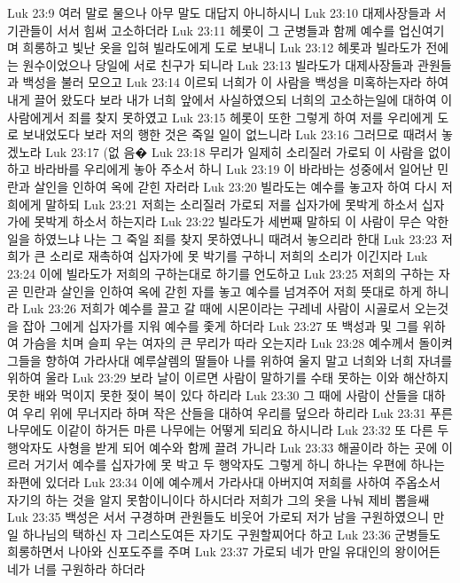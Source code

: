 Luk 23:9  여러 말로 물으나 아무 말도 대답지 아니하시니
Luk 23:10  대제사장들과 서기관들이 서서 힘써 고소하더라
Luk 23:11  헤롯이 그 군병들과 함께 예수를 업신여기며 희롱하고 빛난 옷을 입혀 빌라도에게 도로 보내니
Luk 23:12  헤롯과 빌라도가 전에는 원수이었으나 당일에 서로 친구가 되니라
Luk 23:13  빌라도가 대제사장들과 관원들과 백성을 불러 모으고
Luk 23:14  이르되 너희가 이 사람을 백성을 미혹하는자라 하여 내게 끌어 왔도다 보라 내가 너희 앞에서 사실하였으되 너희의 고소하는일에 대하여 이 사람에게서 죄를 찾지 못하였고
Luk 23:15  헤롯이 또한 그렇게 하여 저를 우리에게 도로 보내었도다 보라 저의 행한 것은 죽일 일이 없느니라
Luk 23:16  그러므로 때려서 놓겠노라
Luk 23:17  (없 음�
Luk 23:18  무리가 일제히 소리질러 가로되 이 사람을 없이하고 바라바를 우리에게 놓아 주소서 하니
Luk 23:19  이 바라바는 성중에서 일어난 민란과 살인을 인하여 옥에 갇힌 자러라
Luk 23:20  빌라도는 예수를 놓고자 하여 다시 저희에게 말하되
Luk 23:21  저희는 소리질러 가로되 저를 십자가에 못박게 하소서 십자가에 못박게 하소서 하는지라
Luk 23:22  빌라도가 세번째 말하되 이 사람이 무슨 악한 일을 하였느냐 나는 그 죽일 죄를 찾지 못하였나니 때려서 놓으리라 한대
Luk 23:23  저희가 큰 소리로 재촉하여 십자가에 못 박기를 구하니 저희의 소리가 이긴지라
Luk 23:24  이에 빌라도가 저희의 구하는대로 하기를 언도하고
Luk 23:25  저희의 구하는 자 곧 민란과 살인을 인하여 옥에 갇힌 자를 놓고 예수를 넘겨주어 저희 뜻대로 하게 하니라
Luk 23:26  저희가 예수를 끌고 갈 때에 시몬이라는 구레네 사람이 시골로서 오는것을 잡아 그에게 십자가를 지워 예수를 좇게 하더라
Luk 23:27  또 백성과 및 그를 위하여 가슴을 치며 슬피 우는 여자의 큰 무리가 따라 오는지라
Luk 23:28  예수께서 돌이켜 그들을 향하여 가라사대 예루살렘의 딸들아 나를 위하여 울지 말고 너희와 너희 자녀를 위하여 울라
Luk 23:29  보라 날이 이르면 사람이 말하기를 수태 못하는 이와 해산하지 못한 배와 먹이지 못한 젖이 복이 있다 하리라
Luk 23:30  그 때에 사람이 산들을 대하여 우리 위에 무너지라 하며 작은 산들을 대하여 우리를 덮으라 하리라
Luk 23:31  푸른 나무에도 이같이 하거든 마른 나무에는 어떻게 되리요 하시니라
Luk 23:32  또 다른 두 행악자도 사형을 받게 되어 예수와 함께 끌려 가니라
Luk 23:33  해골이라 하는 곳에 이르러 거기서 예수를 십자가에 못 박고 두 행악자도 그렇게 하니 하나는 우편에 하나는 좌편에 있더라
Luk 23:34  이에 예수께서 가라사대 아버지여 저희를 사하여 주옵소서 자기의 하는 것을 알지 못함이니이다 하시더라 저희가 그의 옷을 나눠 제비 뽑을쌔
Luk 23:35  백성은 서서 구경하며 관원들도 비웃어 가로되 저가 남을 구원하였으니 만일 하나님의 택하신 자 그리스도여든 자기도 구원할찌어다 하고
Luk 23:36  군병들도 희롱하면서 나아와 신포도주를 주며
Luk 23:37  가로되 네가 만일 유대인의 왕이어든 네가 너를 구원하라 하더라
